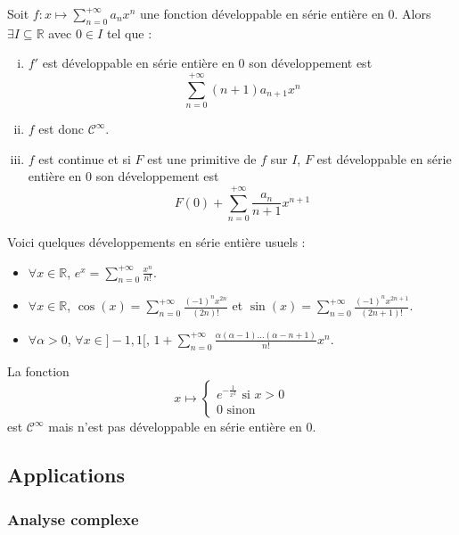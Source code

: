 	\begin{proposition}
		Soit $f : x \mapsto \sum_{n=0}^{+\infty} a_n x^n$ une fonction développable en série entière en $0$. Alors $\exists I \subseteq \mathbb{R}$ avec $0 \in I$ tel que :
		\begin{enumerate}[(i)]
			\item $f'$ est développable en série entière en $0$ son développement est
			\[ \sum_{n=0}^{+\infty} (n+1) a_{n+1} x^n \]
			\item $f$ est donc $\mathcal{C}^\infty$.
			\item $f$ est continue et si $F$ est une primitive de $f$ sur $I$, $F$ est développable en série entière en $0$ son développement est
			\[ F(0) + \sum_{n=0}^{+\infty} \frac{a_n}{n+1} x^{n+1} \]
		\end{enumerate}
	\end{proposition}

	\begin{example}
		Voici quelques développements en série entière usuels :
		\begin{itemize}
			\item $\forall x \in \mathbb{R}$, $e^x = \sum_{n=0}^{+\infty} \frac{x^n}{n!}$.
			\item $\forall x \in \mathbb{R}$, $\cos(x) = \sum_{n=0}^{+\infty} \frac{(-1)^n x^{2n}}{(2n)!}$ et $\sin(x) = \sum_{n=0}^{+\infty} \frac{(-1)^n x^{2n+1}}{(2n+1)!}$.
			\item $\forall \alpha > 0$, $\forall x \in ]-1,1[$, $1 + \sum_{n=0}^{+\infty} \frac{\alpha(\alpha - 1) \dots (\alpha - n + 1)}{n!} x^n$.
		\end{itemize}
	\end{example}


	\begin{cexample}
		La fonction
		\[
		x \mapsto \begin{cases}
			e^{-\frac{1}{x^2}} \text{ si } x > 0 \\
			0 \text{ sinon}
		\end{cases}
		\]
		est $\mathcal{C}^\infty$ mais n'est pas développable en série entière en $0$.
	\end{cexample}

	\subsection{Applications}

	\subsubsection{Analyse complexe}

